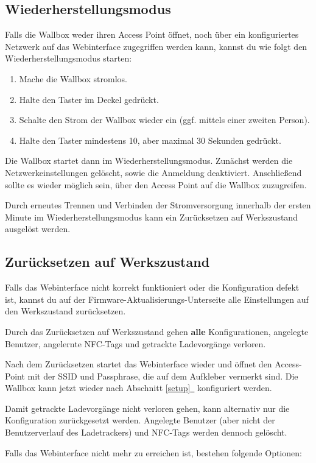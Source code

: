 \documentclass[a4paper,10pt]{article}
\newcommand{\hint}[1]{\begin{tcolorbox}[colback=boxgray,colframe=black,coltext=
white,title=Hinweis,left*=2mm,right*=2mm,boxsep=1mm,bottom=1mm,top=1mm]#1\end{tcolorbox}}
\newcommand*{\fullref}[1]{Abschnitt \hyperref[{#1}]{\ref*{#1}~\nameref*{#1}}}
\begin{document}
\begin{multicols*}{2}
    \subsection{Wiederherstellungsmodus}\label{recovery}
    Falls die Wallbox weder ihren Access Point öffnet, noch über ein konfiguriertes Netzwerk auf das Webinterface zugegriffen werden kann,
    kannst du wie folgt den Wiederherstellungsmodus starten:
    \begin{enumerate}
     \item Mache die Wallbox stromlos.
     \item Halte den Taster im Deckel gedrückt.
     \item Schalte den Strom der Wallbox wieder ein (ggf. mittels einer zweiten Person).
     \item Halte den Taster mindestens 10, aber maximal 30 Sekunden gedrückt.
    \end{enumerate}
    Die Wallbox startet dann im Wiederherstellungsmodus. Zunächst werden die Netzwerkeinstellungen gelöscht, sowie die Anmeldung deaktiviert.
    Anschließend sollte es wieder möglich sein, über den Access Point auf die Wallbox zuzugreifen.

    Durch erneutes Trennen und Verbinden der Stromversorgung innerhalb der ersten Minute im Wiederherstellungsmodus kann ein Zurücksetzen auf Werkszustand ausgelöst werden.

    \subsection{Zurücksetzen auf Werkszustand}\label{reset}
    Falls das Webinterface nicht korrekt funktioniert oder die Konfiguration defekt ist,
    kannst du auf der Firmware-Aktualisierungs-Unterseite alle Einstellungen auf den Werkszustand zurücksetzen.
    \hint{Durch das Zurücksetzen auf Werkszustand gehen \mbox{\textbf{alle}} Konfigurationen, angelegte Benutzer, angelernte NFC-Tags und getrackte Ladevorgänge verloren.}
    Nach dem Zurücksetzen startet das Webinterface wieder und öffnet
    den Access-Point mit der SSID und Passphrase, die auf dem Aufkleber vermerkt
    sind. Die Wallbox kann jetzt wieder nach \fullref{setup} konfiguriert werden.

    Damit getrackte Ladevorgänge nicht verloren gehen, kann alternativ nur die Konfiguration zurückgesetzt werden.
    Angelegte Benutzer (aber nicht der Benutzerverlauf des Ladetrackers) und NFC-Tags werden dennoch gelöscht.

    Falls das Webinterface nicht mehr zu erreichen ist, bestehen folgende Optionen:


\end{multicols*}
\end{document}
